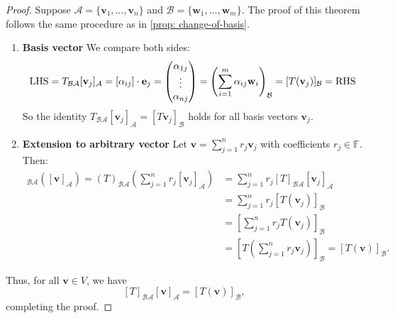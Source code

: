\begin{proof}
Suppose \( \mathcal{A} = \{ \mathbf{v}_1, \dots, \mathbf{v}_n \} \) and \( \mathcal{B} = \{ \mathbf{w}_1, \dots, \mathbf{w}_m \} \). The proof of this theorem follows the same procedure as in \autoref{prop: change-of-basis}.

\begin{enumerate}
    \item \textbf{Basis vector} We compare both sides:
\begin{align*}
\text{LHS} = T_{\mathcal{B}\mathcal{A}} [{\bf v}_j]_{\mathcal{A}} = [\alpha_{ij}] \cdot \mathbf{e}_j = \begin{pmatrix} \alpha_{1j} \\ \vdots \\ \alpha_{nj} \end{pmatrix} = \left( \sum_{i=1}^{m} \alpha_{ij} \mathbf{w}_i \right)_{\mathcal{B}} = [T (\mathbf{v}_j)]_{\mathcal{B}} = \text{RHS} 
\end{align*}
So the identity \( T_{\mathcal{B}\mathcal{A}} [\mathbf{v}_j]_{\mathcal{A}} = [T\mathbf{v}_j]_{\mathcal{B}} \) holds for all basis vectors \( \mathbf{v}_j \).

\item \textbf{Extension to arbitrary vector}
Let \( \mathbf{v} = \sum_{j=1}^n r_j \mathbf{v}_j \) with coefficients \( r_j \in \mathbb{F} \). Then:
\begin{align*}
[T]_{\mathcal{B}\mathcal{A}}([\mathbf{v}]_{\mathcal{A}}) = (T)_{\mathcal{B}\mathcal{A}}\left( \sum_{j=1}^n r_j [\mathbf{v}_j]_{\mathcal{A}} \right) 
&= \sum_{j=1}^n r_j [T]_{\mathcal{B}\mathcal{A}}[\mathbf{v}_j]_{\mathcal{A}}  \\
&= \sum_{j=1}^n r_j [T (\mathbf{v}_j)]_{\mathcal{B}}  \\
&= \left[ \sum_{j=1}^n r_j T(\mathbf{v}_j)\right]_{\mathcal{B}}\\
&= [T(\sum_{j=1}^n r_j \mathbf{v}_j)]_{\mathcal{B}} = [T( \mathbf{v})]_{\mathcal{B}}.
\end{align*}
\end{enumerate}

Thus, for all \( \mathbf{v} \in V \), we have
\[
[T]_{\mathcal{B}\mathcal{A}} [\mathbf{v}]_{\mathcal{A}} = [T(\mathbf{v})]_{\mathcal{B}},
\]
completing the proof.
\end{proof}

